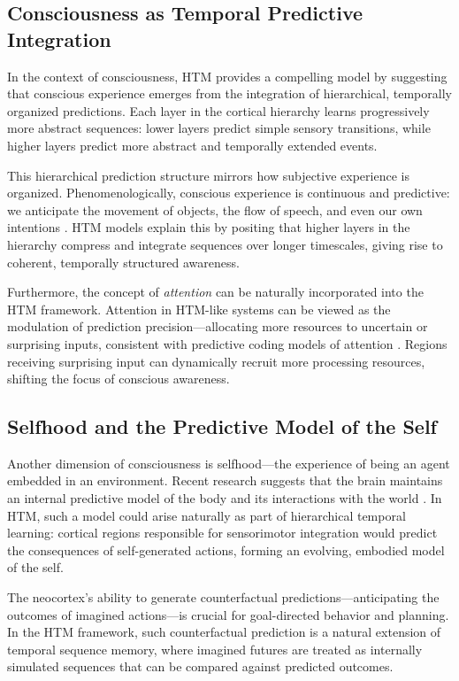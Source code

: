 \documentclass[12pt]{article}
\begin{document}
\subsection*{Consciousness as Temporal Predictive Integration}

In the context of consciousness, HTM provides a compelling model by suggesting that conscious experience emerges from the integration of hierarchical, temporally organized predictions. Each layer in the cortical hierarchy learns progressively more abstract sequences: lower layers predict simple sensory transitions, while higher layers predict more abstract and temporally extended events.

This hierarchical prediction structure mirrors how subjective experience is organized. Phenomenologically, conscious experience is continuous and predictive: we anticipate the movement of objects, the flow of speech, and even our own intentions \cite{clark2016surfinguncertainty,seth2015prediction}. HTM models explain this by positing that higher layers in the hierarchy compress and integrate sequences over longer timescales, giving rise to coherent, temporally structured awareness.

Furthermore, the concept of \textit{attention} can be naturally incorporated into the HTM framework. Attention in HTM-like systems can be viewed as the modulation of prediction precision—allocating more resources to uncertain or surprising inputs, consistent with predictive coding models of attention \cite{feldman2010attention}. Regions receiving surprising input can dynamically recruit more processing resources, shifting the focus of conscious awareness.

\subsection*{Selfhood and the Predictive Model of the Self}

Another dimension of consciousness is selfhood—the experience of being an agent embedded in an environment. Recent research suggests that the brain maintains an internal predictive model of the body and its interactions with the world \cite{apps2015prediction}. In HTM, such a model could arise naturally as part of hierarchical temporal learning: cortical regions responsible for sensorimotor integration would predict the consequences of self-generated actions, forming an evolving, embodied model of the self.

The neocortex's ability to generate counterfactual predictions—anticipating the outcomes of imagined actions—is crucial for goal-directed behavior and planning. In the HTM framework, such counterfactual prediction is a natural extension of temporal sequence memory, where imagined futures are treated as internally simulated sequences that can be compared against predicted outcomes.
\end{document}
